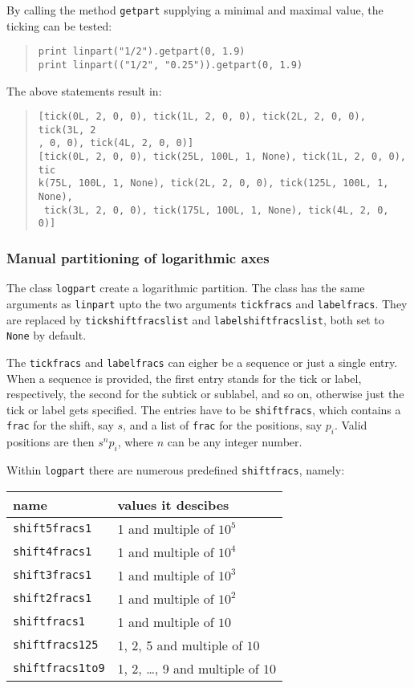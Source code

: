 By calling the method \verb|getpart| supplying a minimal and maximal
value, the ticking can be tested:
\begin{quote}
\begin{verbatim}
print linpart("1/2").getpart(0, 1.9)
print linpart(("1/2", "0.25")).getpart(0, 1.9)
\end{verbatim}
\end{quote}
The above statements result in:
\begin{quote}
\begin{verbatim}
[tick(0L, 2, 0, 0), tick(1L, 2, 0, 0), tick(2L, 2, 0, 0), tick(3L, 2
, 0, 0), tick(4L, 2, 0, 0)]
[tick(0L, 2, 0, 0), tick(25L, 100L, 1, None), tick(1L, 2, 0, 0), tic
k(75L, 100L, 1, None), tick(2L, 2, 0, 0), tick(125L, 100L, 1, None),
 tick(3L, 2, 0, 0), tick(175L, 100L, 1, None), tick(4L, 2, 0, 0)]
\end{verbatim}
\end{quote}

\subsubsection{Manual partitioning of logarithmic axes}

The class \verb|logpart| create a logarithmic partition. The class has
the same arguments as \verb|linpart| upto the two arguments
\verb|tickfracs| and \verb|labelfracs|. They are replaced by
\verb|tickshiftfracslist| and \verb|labelshiftfracslist|, both set to
\verb|None| by default.

The \verb|tickfracs| and \verb|labelfracs| can eigher be a sequence or
just a single entry. When a sequence is provided, the first entry
stands for the tick or label, respectively, the second for the
subtick or sublabel, and so on, otherwise just the tick or label gets
specified. The entries have to be \verb|shiftfracs|, which contains a
\verb|frac| for the shift, say $s$, and a list of \verb|frac| for the
positions, say $p_i$. Valid positions are then $s^np_i$, where $n$ can
be any integer number.

Within \verb|logpart| there are numerous predefined \verb|shiftfracs|,
namely:

\begin{center}
\begin{tabular}{ll}
name&values it descibes\\
\hline
\texttt{shift5fracs1}&1 and multiple of $10^5$\\
\texttt{shift4fracs1}&1 and multiple of $10^4$\\
\texttt{shift3fracs1}&1 and multiple of $10^3$\\
\texttt{shift2fracs1}&1 and multiple of $10^2$\\
\texttt{shiftfracs1}&1 and multiple of $10$\\
\texttt{shiftfracs125}&1, 2, 5 and multiple of $10$\\
\texttt{shiftfracs1to9}&1, 2, \dots, 9 and multiple of $10$\\
\end{tabular}
\end{center}

